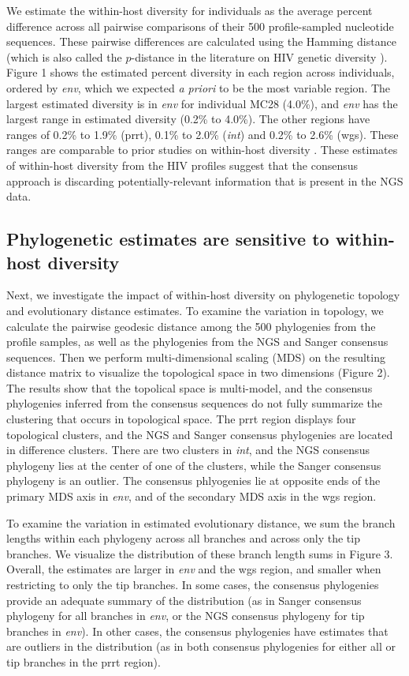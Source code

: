 \documentclass[letterpaper]{article}
\begin{document}
We estimate the within-host diversity for individuals as the average percent difference across all pairwise comparisons of their 500 profile-sampled nucleotide sequences. These pairwise differences are calculated using the Hamming distance \parencite{allam} (which is also called the $p$-distance in the literature on HIV genetic diversity \parencite{maldarelli, hassan}). Figure 1 shows the estimated percent diversity in each region across individuals, ordered by \emph{env}, which we expected \emph{a priori} to be the most variable region. The largest estimated diversity is in \emph{env} for individual MC28 (4.0\%), and \emph{env} has the largest range in estimated diversity (0.2\% to 4.0\%). The other regions have ranges of 0.2\% to 1.9\% (prrt), 0.1\% to 2.0\% (\emph{int}) and 0.2\% to 2.6\% (wgs). These ranges are comparable to prior studies on within-host diversity \parencite{li, zanini}. These estimates of within-host diversity from the HIV profiles suggest that the consensus approach is discarding potentially-relevant information that is present in the NGS data.

\subsection*{Phylogenetic estimates are sensitive to within-host diversity}

Next, we investigate the impact of within-host diversity on phylogenetic topology and evolutionary distance estimates. To examine the variation in topology, we calculate the pairwise geodesic distance \parencite{billera,owen} among the 500 phylogenies from the profile samples, as well as the phylogenies from the NGS and Sanger consensus sequences. Then we perform multi-dimensional scaling (MDS) on the resulting distance matrix to visualize the topological space in two dimensions (Figure 2). The results show that the topolical space is multi-model, and the consensus phylogenies inferred from the consensus sequences do not fully summarize the clustering that occurs in topological space. The prrt region displays four topological clusters, and the NGS and Sanger consensus phylogenies are located in difference clusters. There are two clusters in \emph{int}, and the NGS consensus phylogeny lies at the center of one of the clusters, while the Sanger consensus phylogeny is an outlier. The consensus phlyogenies lie at opposite ends of the primary MDS axis in \emph{env}, and of the secondary MDS axis in the wgs region.

To examine the variation in estimated evolutionary distance, we sum the branch lengths within each phylogeny across all branches and across only the tip branches. We visualize the distribution of these branch length sums in Figure 3. Overall, the estimates are larger in \emph{env} and the wgs region, and smaller when restricting to only the tip branches. In some cases, the consensus phylogenies provide an adequate summary of the distribution (as in Sanger consensus phylogeny for all branches in \emph{env}, or the NGS consensus phylogeny for tip branches in \emph{env}). In other cases, the consensus phylogenies have estimates that are outliers in the distribution (as in both consensus phylogenies for either all or tip branches in the prrt region).
\end{document}
